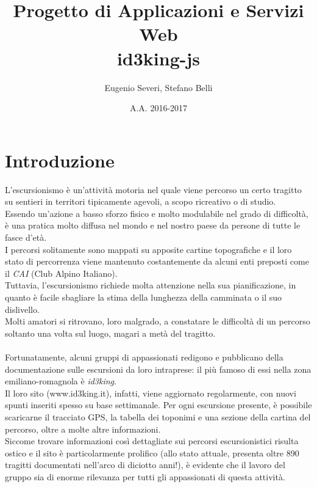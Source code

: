 \documentclass[11pt]{report}
\begin{document}
\title{Progetto di Applicazioni e Servizi Web\\id3king-js}
\author{Eugenio Severi, Stefano Belli}
\date{A.A. 2016-2017}
\begin{titlepage}
	\maketitle
\end{titlepage}

\setcounter{chapter}{1}
\section{Introduzione}
L'escursionismo è un'attività motoria nel quale viene percorso un certo tragitto su sentieri in territori tipicamente agevoli, a scopo ricreativo o di studio.
\\Essendo un'azione a basso sforzo fisico e molto modulabile nel grado di difficoltà, è una pratica molto diffusa nel mondo e nel nostro paese da persone di tutte le fasce d'età.\\
I percorsi solitamente sono mappati su apposite cartine topografiche e il loro stato di percorrenza viene mantenuto costantemente da alcuni enti preposti come il \textit{CAI} (Club Alpino Italiano).
\\Tuttavia, l'escursionismo richiede molta attenzione nella sua pianificazione, in quanto è facile sbagliare la stima della lunghezza della camminata o il suo dislivello.
\\Molti amatori si ritrovano, loro malgrado, a constatare le difficoltà di un percorso soltanto una volta sul luogo, magari a metà del tragitto.
\\\\Fortunatamente, alcuni gruppi di appassionati redigono e pubblicano della documentazione sulle escursioni da loro intraprese: il più famoso di essi nella zona emiliano-romagnola è \textit{id3king}.
\\Il loro sito (www.id3king.it), infatti, viene aggiornato regolarmente, con nuovi spunti  inseriti spesso su base settimanale.
Per ogni escursione presente, è possibile scaricarne il tracciato GPS, la tabella dei toponimi e una sezione della cartina del percorso, oltre a molte altre informazioni.
\\Siccome trovare informazioni così dettagliate sui percorsi escursionistici risulta ostico e il sito è particolarmente prolifico (allo stato attuale, presenta oltre 890 tragitti documentati nell'arco di diciotto anni!), è evidente che il lavoro del gruppo sia di enorme rilevanza per tutti gli appassionati di questa attività.
\end{document}
